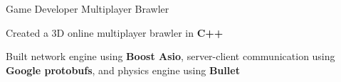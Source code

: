 \begin{cventries}
\cventry
{Game Developer} %
{Multiplayer Brawler} %
{} %
{} %
{ %
\begin{cvitems}
\item{Created a 3D online multiplayer brawler in \textbf{C++}}
\item{Built network engine using \textbf{Boost Asio}, server-client communication using \textbf{Google protobufs}, and physics engine using \textbf{Bullet}}
\end{cvitems}
}


\end{cventries}
